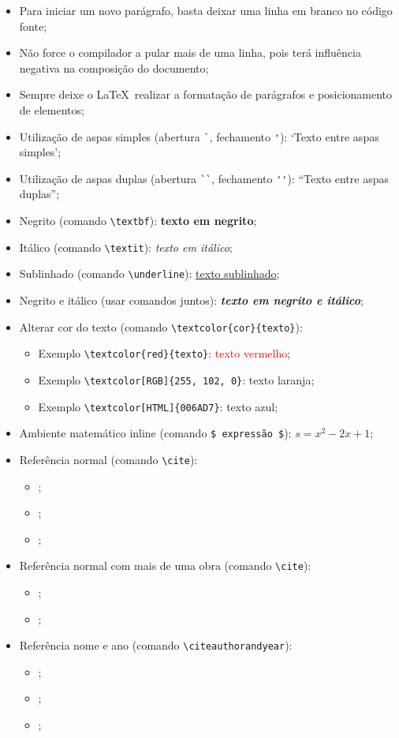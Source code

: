 \begin{itemize}
	\item Para iniciar um novo parágrafo, basta deixar uma linha em branco no código fonte;
	\item Não force o compilador a pular mais de uma linha, pois terá influência negativa na composição do documento;
	\item Sempre deixe o \LaTeX\ realizar a formatação de parágrafos e posicionamento de elementos;
	\item Utilização de aspas simples (abertura \verb|`|, fechamento \verb|'|): `Texto entre aspas simples';
	\item Utilização de aspas duplas (abertura \verb|``|, fechamento \verb|''|): ``Texto entre aspas duplas'';
	\item Negrito (comando \verb|\textbf|): \textbf{texto em negrito};
	\item Itálico (comando \verb|\textit|): \textit{texto em itálico};
	\item Sublinhado (comando \verb|\underline|): \underline{texto sublinhado};
	\item Negrito e itálico (usar comandos juntos): \textbf{\textit{texto em negrito e itálico}};
	\item Alterar cor do texto (comando \verb|\textcolor{cor}{texto}|):
	\begin{itemize}
		\item Exemplo \verb|\textcolor{red}{texto}|: \textcolor{red}{texto vermelho};
		\item Exemplo \verb|\textcolor[RGB]{255, 102, 0}|: \textcolor[RGB]{255, 102, 0}{texto laranja};
		\item Exemplo \verb|\textcolor[HTML]{006AD7}|: \textcolor[HTML]{006AD7}{texto azul};
	\end{itemize}
	\item Ambiente matemático inline (comando \verb|$ expressão $|): $s = x^2-2x +1$;
	\item Referência normal (comando \verb|\cite|):
	\begin{itemize}
		\item \cite{Agaisse1995};
		\item \cite{Abedi2014};
		\item \cite{BtNomenclature2016};
	\end{itemize}
	\item Referência normal com mais de uma obra (comando \verb|\cite|):
	\begin{itemize}
		\item \cite{Agaisse1995, Abedi2014};
		\item \cite{Nelson2014, BtNomenclature2016, AgapitoTenfen2014};
	\end{itemize}
	\item Referência nome e ano (comando \verb|\citeauthorandyear|):
	\begin{itemize}
		\item {};
		\item {};
		\item {};
	\end{itemize}
\end{itemize}


